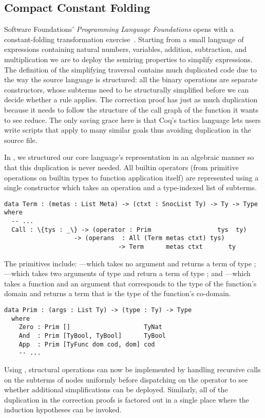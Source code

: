 \subsection{Compact Constant Folding}
\label{sec:design:constants}

Software Foundations' \emph{Programming Language Foundations} opens with a constant-folding transformation exercise~\cite[Chapter~1]{Pierce:SF2}.
%
Starting from a small language of expressions containing natural numbers, variables, addition, subtraction, and multiplication we are to deploy the semiring properties to simplify expressions.
%
The definition of the simplifying traversal contains much duplicated code due to the way the source language is structured:
%
all the binary operations are separate constructors, whose subterms need to be structurally simplified before we can decide whether a rule applies.
%
The correction proof has just as much duplication because it needs to follow the structure of the call graph of the function it wants to see reduce.
%
The only saving grace here is that Coq's tactics language lets users write scripts that apply to many similar goals thus avoiding duplication in the source file.

In \Velo{}, we structured our core language's representation in an algebraic
manner so that this duplication is never needed.
%
All builtin operators (from primitive operations on builtin types to function
application itself) are represented using a single  constructor
which takes an operation and a type-indexed list of subterms.

\begin{Verbatim}
data Term : (metas : List Meta) -> (ctxt : SnocList Ty) -> Ty -> Type where
  -- ...
  Call : \{tys : _\} -> (operator : Prim                  tys  ty)
                   -> (operans  : All (Term metas ctxt) tys)
                               -> Term      metas ctxt       ty
\end{Verbatim}

The primitives include:
%
---which takes no argument and returns a term of type ;
%
---which takes two arguments of type  and return a term
of type ;
%
and
%
---which takes a function and an argument that corresponds to the type of the function's domain and returns a term that is the type of the function's co-domain.

\begin{Verbatim}
data Prim : (args : List Ty) -> (type : Ty) -> Type
  where
    Zero : Prim []                    TyNat
    And  : Prim [TyBool, TyBool]      TyBool
    App  : Prim [TyFunc dom cod, dom] cod
    -- ...
\end{Verbatim}

Using , structural operations can now be implemented by handling recursive calls on the subterms of  nodes uniformly before dispatching on the operator to see whether additional simplifications can be deployed.
%
Similarly, all of the duplication in the correction proofs is factored out in a single place where the induction hypotheses can be invoked.

